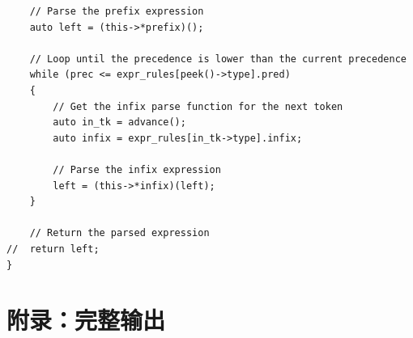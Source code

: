 \documentclass[a4paper,twoside]{article}
\begin{document}
\begin{spacing}{1.2}
\begin{listing}[htb]
\begin{verbatim}
	// Parse the prefix expression
	auto left = (this->*prefix)();

	// Loop until the precedence is lower than the current precedence
	while (prec <= expr_rules[peek()->type].pred)
	{
		// Get the infix parse function for the next token
		auto in_tk = advance();
		auto infix = expr_rules[in_tk->type].infix;

		// Parse the infix expression
		left = (this->*infix)(left);
	}

	// Return the parsed expression
//	return left;
}
	\end{verbatim}
\end{listing}


\clearpage
\appendix
\section{附录：完整输出}
\label{sec:fullout}

\inputminted{bnf}{text/output.txt}

\end{spacing}
\end{document}
